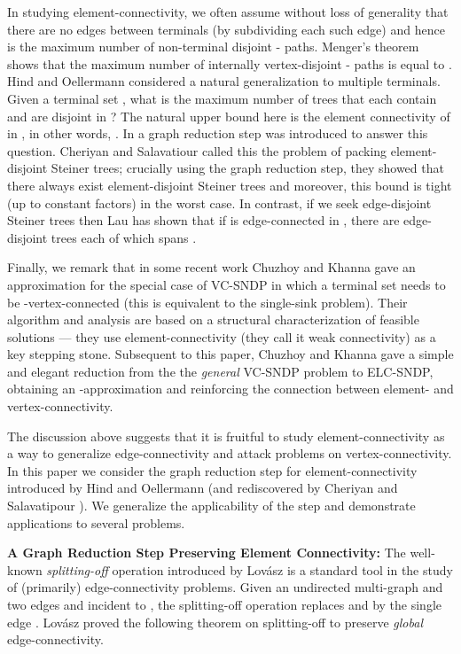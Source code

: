 \documentclass[11pt]{article}
\begin{document}
In studying element-connectivity, we often assume without loss of
generality that there are no edges between terminals (by subdividing
each such edge) and hence  is the maximum number of
non-terminal disjoint - paths. Menger's theorem shows that the
maximum number of internally vertex-disjoint - paths is equal to
.  Hind and Oellermann \cite{hind} considered a natural
generalization to multiple terminals. Given a terminal set , what is the maximum number of trees that each contain
 and are disjoint in ? The natural upper bound here
is the element connectivity of  in , in other words, . In \cite{hind} a graph reduction step
was introduced to answer this question.  Cheriyan and Salavatiour
\cite{cs} called this the problem of packing element-disjoint Steiner
trees; crucially using the graph reduction step, they showed that
there always exist  element-disjoint Steiner
trees and moreover, this bound is tight (up to constant factors) in
the worst case. In contrast, if we seek edge-disjoint Steiner trees
then Lau \cite{Lau1} has shown that if  is  edge-connected in
, there are  edge-disjoint trees each of which spans .

Finally, we remark that in some recent work Chuzhoy and Khanna
\cite{ChuzhoyK08} gave an  approximation for the
special case of VC-SNDP in which a terminal set  needs to be
-vertex-connected (this is equivalent to the single-sink problem).
Their algorithm and analysis are based on a structural
characterization of feasible solutions --- they use
element-connectivity (they call it weak connectivity) as a key
stepping stone. Subsequent to this paper, Chuzhoy and Khanna
\cite{CKsndp} gave a simple and elegant reduction from the the
\emph{general} VC-SNDP problem to ELC-SNDP, obtaining an -approximation and reinforcing the connection between element- and
vertex-connectivity.

The discussion above suggests that it is fruitful to study
element-connectivity as a way to generalize edge-connectivity and
attack problems on vertex-connectivity.  In this paper we consider the
graph reduction step for element-connectivity introduced by Hind and
Oellermann \cite{hind} (and rediscovered by Cheriyan and Salavatipour
\cite{cs}). We generalize the applicability of the step and
demonstrate applications to several problems.

\smallskip
\noindent
{\bf A Graph Reduction Step Preserving Element Connectivity:}
The well-known {\em splitting-off} operation introduced by Lov\'{a}sz
\cite{Lovasz} is a standard tool in the study of (primarily)
edge-connectivity problems. Given an undirected multi-graph  and
two edges  and  incident to , the splitting-off operation
replaces  and  by the single edge .  Lov\'{a}sz proved the
following theorem on splitting-off to preserve {\em global}
edge-connectivity.
\end{document}
